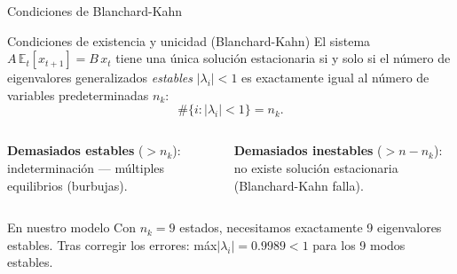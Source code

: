 
\begin{frame}{Condiciones de Blanchard-Kahn}

  \begin{greenbox}{Condiciones de existencia y unicidad (Blanchard-Kahn)}
    El sistema $A\,\mathbb{E}_t[x_{t+1}] = B\,x_t$ tiene una única solución estacionaria si y
    solo si el número de eigenvalores generalizados \emph{estables} $|\lambda_i| < 1$
    es exactamente igual al número de variables predeterminadas $n_k$:
    \[
      \#\{i : |\lambda_i| < 1\} = n_k.
    \]
  \end{greenbox}

  \bigskip
  \begin{columns}
    \textbf{Demasiados estables} ($> n_k$): \\
    \small indeterminación — múltiples equilibrios (burbujas).

    \textbf{Demasiados inestables} ($> n - n_k$): \\
    \small no existe solución estacionaria (Blanchard-Kahn falla). \skull
  \end{columns}

  \bigskip
  \begin{block}{En nuestro modelo}
    Con $n_k = 9$ estados, necesitamos exactamente 9 eigenvalores estables.
    Tras corregir los errores: máx$|\lambda_i| = 0.9989 < 1$ para los 9 modos estables.
    \checkmark
  \end{block}

\end{frame}


